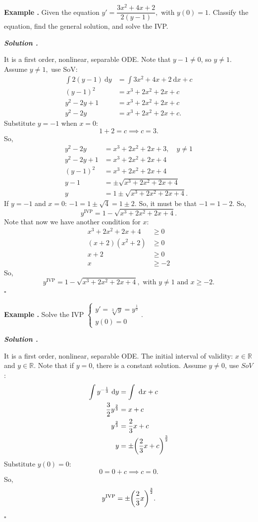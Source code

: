 \documentclass[12pt, a4paper]{article}
\newcounter{index}[subsection]
\newenvironment*{eg}{\begin{framed}\par\noindent\textbf{Example \thesubsection.\stepcounter{index}\theindex}}{\par\end{framed}}
\newcounter{nprf}[subsection]
\newenvironment*{sol}{\par\indent\textbf{\textit{Solution \stepcounter{nprf}\thenprf.}}\par}{\hfill{$\square$}\par}
\def\R{{\mathbb{R}}}
\def\d{{\mathrm{d}}}
\begin{document}
\begin{eg}{}
	Given the equation $y'=\dfrac{3x^2+4x+2}{2(y-1)},$ with $y(0)=1$. Classify the equation, find the general solution, and solve the IVP. 
	\begin{sol}
		It is a first order, nonlinear, separable ODE. Note that $y-1\neq0$, so $y\neq1$. Assume $y\neq1,$ use SoV: \[\begin{aligned}\int2(y-1)\ \d{y}&=\int3x^2+4x+2\ \d{x}+c\\(y-1)^2&=x^3+2x^2+2x+c\\y^2-2y+1&=x^3+2x^2+2x+c\\y^2-2y&=x^3+2x^2+2x+c.\end{aligned}\] Substitute $y=-1$ when $x=0$: \[1+2=c\implies c=3.\] So, \[\begin{aligned}y^2-2y&=x^3+2x^2+2x+3,\quad y\neq1\\y^2-2y+1&=x^3+2x^2+2x+4\\(y-1)^2&=x^3+2x^2+2x+4\\y-1&=\pm\sqrt{x^3+2x^2+2x+4}\\ y&=1\pm\sqrt{x^3+2x^2+2x+4}.\end{aligned}\] If $y=-1$ and $x=0$: $-1=1\pm\sqrt{4}=1\pm2$. So, it must be that $-1=1-2$. So, \[y^\text{IVP}=1-\sqrt{x^3+2x^2+2x+4}.\] Note that now we have another condition for $x$: \[\begin{aligned}x^3+2x^2+2x+4&\geq0\\(x+2)(x^2+2)&\geq0\\x+2&\geq0\\x&\geq-2\end{aligned}\] So, \[y^\text{IVP}=1-\sqrt{x^3+2x^2+2x+4},\text{ with }y\neq1\text{ and }x\geq-2.\]
	\end{sol}
\end{eg}
\begin{eg}{}
	Solve the IVP $\begin{cases}y'=\sqrt[3]{y}=y^\frac{1}{3}\\y(0)=0\end{cases}$. 
	\begin{sol}
		It is a first order, nonlinear, separable ODE. The initial interval of validity: $x\in\R$ and $y\in\R$. Note that if $y=0$, there is a constant solution. Assume $y\neq0$, use $SoV$: \[\begin{aligned}\int y^{-\frac{1}{3}}\ \d{y}&=\int\ \d{x}+c\\\dfrac{3}{2}y^\frac{2}{3}&=x+c\\y^\frac{2}{3}&=\dfrac{2}{3}x+c\\y&=\pm\qty(\dfrac{2}{3}x+c)^\frac{3}{2}\end{aligned}\] Substitute $y(0)=0$: \[0=0+c\implies c=0.\] So, \[y^\text{IVP}=\pm\qty(\dfrac{2}{3}x)^\frac{3}{2}.\]
	\end{sol}
\end{eg}
\end{document}
